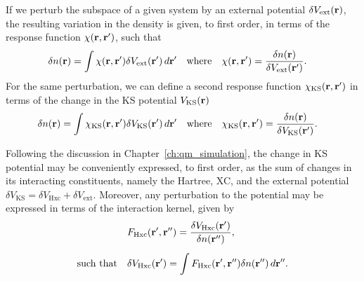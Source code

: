 If we perturb the subspace 
of a given system by an external potential 
$\delta V_\textrm{ext}({{\bf r}})$, 
the resulting variation in the density is given, 
to first order, in terms of the response function 
$\chi({\bf r},{\bf r}')$, such that 
%
\begin{align}
&\delta n({{\bf r}})=\int \chi({{\bf r}}, {{\bf r}'}) \delta V_\textrm{ext}({{\bf r}'})\, d{{\bf r}'} \quad\mbox{where}\quad
\chi({{\bf r}}, {{\bf r}'})=\frac{\delta n({\bf r})}{\delta V_\textrm{ext}({\bf r}')}.
\end{align}
%
For the same perturbation, 
we can define a second response function 
$\chi_\textrm{KS}({{\bf r}}, {{\bf r}'})$
in terms of the change in the 
KS potential $V_\textrm{KS}({\bf r})$
%
\begin{align}
&\delta n({{\bf r}})=\int \chi_\textrm{KS}({{\bf r}}, {{\bf r}'}) \delta V_\textrm{KS}({{\bf r}'})\, d{{\bf r}'}\quad\mbox{where}\quad
\chi_\textrm{KS}({{\bf r}}, {{\bf r}'})=\frac{\delta n({\bf r})}{\delta V_\textrm{KS}({\bf r}')}.
\label{eq:non_interacting_response1}
\end{align}


Following the discussion in Chapter~\ref{ch:qm_simulation}, 
the change in KS potential may be 
conveniently expressed, to first order, as the sum 
of changes in its interacting constituents, namely the 
Hartree,  XC, and the external potential  
$\delta V_\textrm{KS} = \delta V_\textrm{Hxc} + \delta V_\textrm{ext}$.
%
Moreover, any perturbation to the potential 
may be expressed in terms of the interaction kernel, 
given by 
%
\begin{align}
&F_\textrm{Hxc}({{\bf r}'},{{\bf r}''})=\frac{\delta V_\textrm{Hxc}({{\bf r}'})}{\delta n({{\bf r}''})}, 
\nonumber \\[0.5em]
\mbox{such that}\quad &
\delta V_\textrm{Hxc}({\bf r}')=\int F_\textrm{Hxc}({{\bf r}'},{{\bf r}''})\delta n({{\bf r}''})\, d{{\bf r}''}.
\label{eq:non_interacting_response2}
\end{align}

